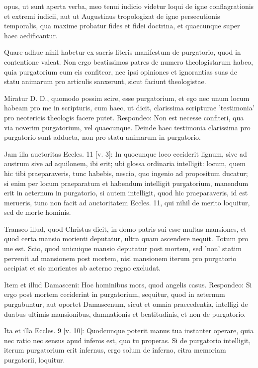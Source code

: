 opus, ut sunt aperta verba, meo tenui iudicio videtur loqui de igne conflagrationis et extremi iudicii, aut ut Augustinus tropologizat de igne persecutionis temporalis, qua maxime probatur fides et fidei doctrina, et quaecunque super haec aedificantur.

Quare adhuc nihil habetur ex sacris literis manifestum de purgatorio, quod in contentione valeat. Non ergo beatissimos patres de numero theologistarum habeo, quia purgatorium cum eis confiteor, nec ipsi opiniones et ignorantias suas de statu animarum pro articulis sanxerunt, sicut faciunt theologistae.

\marginpar{\small[331]} Miratur D. D., quomodo possim scire, esse purgatorium, et ego nec unum locum habeam pro me in scripturis, cum haec, ut dicit, clarissima scripturae 'testimonia' pro neotericis theologis facere putet. Respondeo: Non est necesse confiteri, qua via noverim purgatorium, vel quaecunque. Deinde haec testimonia clarissima pro purgatorio sunt adducta, non pro statu animarum in purgatorio.

Jam illa auctoritas Eccles. 11 [v. 3]: In quocunque loco ceciderit lignum, sive ad austrum sive ad aquilonem, ibi erit; ubi glossa ordinaria intelligit: locum, quem hic tibi praeparaveris, tunc habebis, nescio, quo ingenio ad propositum ducatur; si enim per locum praeparatum et habendum intelligit purgatorium, manendum erit in aeternum in purgatorio, si autem intelligit, quod hic praeparaveris, id est merueris, tunc non facit ad auctoritatem Eccles. 11, qui nihil de merito loquitur, sed de morte hominis.

Transeo illud, quod Christus dicit, in domo patris sui esse multas mansiones, et quod certa mansio morienti deputatur, ultra quam ascendere nequit. Totum pro me est. Scio, quod unicuique mansio deputatur post mortem, sed 'non' statim pervenit ad mansionem post mortem, nisi mansionem iterum pro purgatorio accipiat et sic morientes ab aeterno regno excludat.

Item et illud Damasceni: Hoc hominibus mors, quod angelis casus. Respondeo: Si ergo post mortem ceciderint in purgatorium, sequitur, quod in aeternum purgabuntur, aut oportet Damascenum, sicut et omnia praecedentia, intelligi de duabus ultimis mansionibus, damnationis et beatitudinis, et non de purgatorio.

Ita et illa Eccles. 9 [v. 10]: Quodcunque poterit manus tua instanter operare, quia nec ratio nec sensus apud inferos est, quo tu properas. Si de purgatorio intelligit, iterum purgatorium erit infernus, ergo solum de inferno, citra memoriam purgatorii, loquitur.

